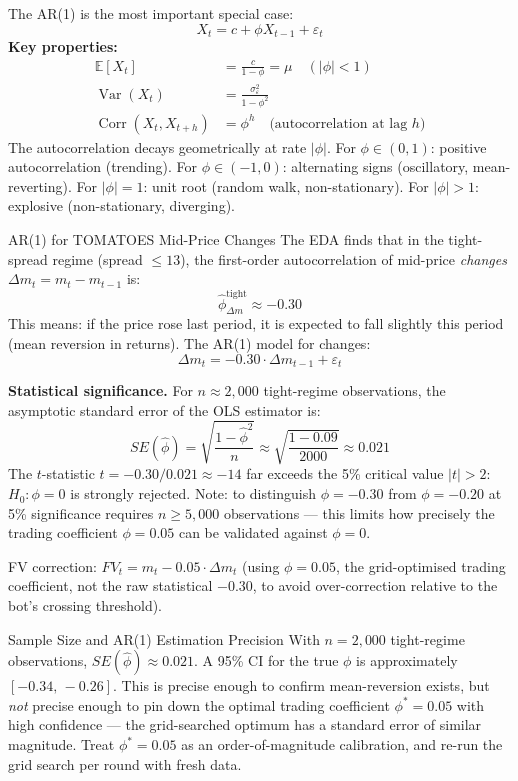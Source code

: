 \documentclass[12pt,a4paper,openany]{report}
\theoremstyle{definition}
\newcommand{\E}{\mathbb{E}}
\newcommand{\Var}{\operatorname{Var}}
\newcommand{\Corr}{\operatorname{Corr}}
\begin{document}
The AR(1) is the most important special case:
\[
  X_t = c + \phi X_{t-1} + \varepsilon_t
\]
\textbf{Key properties:}
\begin{align}
  \E[X_t] &= \frac{c}{1-\phi} = \mu \quad (|\phi| < 1) \\
  \Var(X_t) &= \frac{\sigma_\varepsilon^2}{1-\phi^2} \\
  \Corr(X_t, X_{t+h}) &= \phi^h \quad \text{(autocorrelation at lag $h$)}
\end{align}
The autocorrelation decays geometrically at rate $|\phi|$. For $\phi \in (0,1)$: positive autocorrelation (trending). For $\phi \in (-1,0)$: alternating signs (oscillatory, mean-reverting). For $|\phi| = 1$: unit root (random walk, non-stationary). For $|\phi| > 1$: explosive (non-stationary, diverging).

\begin{examplebox}{AR(1) for TOMATOES Mid-Price Changes}
The EDA finds that in the tight-spread regime (spread $\leq 13$), the first-order autocorrelation of mid-price \emph{changes} $\Delta m_t = m_t - m_{t-1}$ is:
\[
  \hat{\phi}_{\Delta m}^{\text{tight}} \approx -0.30
\]
This means: if the price rose last period, it is expected to fall slightly this period (mean reversion in returns). The AR(1) model for changes:
\[
  \Delta m_t = -0.30 \cdot \Delta m_{t-1} + \varepsilon_t
\]

\textbf{Statistical significance.} For $n \approx 2{,}000$ tight-regime observations, the asymptotic standard error of the OLS estimator is:
\[
  SE(\hat{\phi}) = \sqrt{\frac{1-\hat{\phi}^2}{n}} \approx \sqrt{\frac{1-0.09}{2000}} \approx 0.021
\]
The $t$-statistic $t = -0.30/0.021 \approx -14$ far exceeds the 5\% critical value $|t| > 2$: $H_0\!: \phi = 0$ is strongly rejected. Note: to distinguish $\phi = -0.30$ from $\phi = -0.20$ at 5\% significance requires $n \geq 5{,}000$ observations — this limits how precisely the trading coefficient $\phi = 0.05$ can be validated against $\phi = 0$.

FV correction: $FV_t = m_t - 0.05 \cdot \Delta m_t$ (using $\phi = 0.05$, the grid-optimised trading coefficient, not the raw statistical $-0.30$, to avoid over-correction relative to the bot's crossing threshold).
\end{examplebox}

\begin{warningbox}{Sample Size and AR(1) Estimation Precision}
With $n = 2{,}000$ tight-regime observations, $SE(\hat{\phi}) \approx 0.021$. A 95\% CI for the true $\phi$ is approximately $[-0.34,\,-0.26]$. This is precise enough to confirm mean-reversion exists, but \emph{not} precise enough to pin down the optimal trading coefficient $\phi^* = 0.05$ with high confidence — the grid-searched optimum has a standard error of similar magnitude. Treat $\phi^* = 0.05$ as an order-of-magnitude calibration, and re-run the grid search per round with fresh data.
\end{warningbox}
\end{document}
